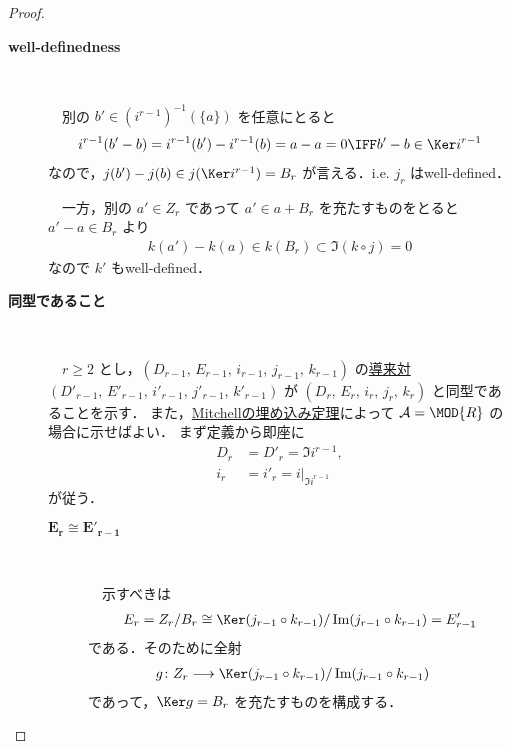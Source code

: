 \documentclass[algtopo_main]{subfiles}
\begin{document}
\begin{proof}
    \begin{description}
        \item[\textbf{well-definedness}]　 
        
        　別の $b' \in (i^{r-1})^{-1}(\{a\})$ を任意にとると
        \begin{align}
            i^{r-1}(b' - b) = i^{r-1}(b') - i^{r-1}(b) = a-a = 0 \IFF b' - b \in \Ker i^{r-1}
        \end{align}
        なので，$j(b') - j(b) \in j(\Ker i^{r-1}) = B_r$ が言える．i.e. $j_r$ はwell-defined．

        　一方，別の $a' \in Z_r$ であって $a' \in a + B_r$ を充たすものをとると $a' - a \in B_r$ より
        \begin{align}
            k(a') - k(a) \in k(B_r) \subset \Im (k\circ j) = 0
        \end{align}
        なので $k'$ もwell-defined．
        \item[\textbf{同型であること}]　
        
        　$r \ge 2$ とし，$(D_{r-1},\, E_{r-1},\, i_{r-1},\, j_{r-1},\, k_{r-1})$ の\hyperref[prop:derived-couple]{導来対} $(D'_{r-1},\, E'_{r-1},\, i'_{r-1},\, j'_{r-1},\, k'_{r-1})$ が $(D_r,\, E_r,\, i_r,\, j_r,\, k_r)$ と同型であることを示す．
        また，\hyperref[thm:embedding]{Mitchellの埋め込み定理}によって $\mathcal{A} = \MOD{R}$ の場合に示せばよい．
        まず定義から即座に
        \begin{align}
            D_r &= D'_r =\Im i^{r-1}, \\
            i_r &= i'_r = i|_{\Im i^{r-1}}
        \end{align}
        が従う．
        
        \begin{description}
            \item[\textbf{$\bm{E_r \cong E'_{r-1}}$}] 　
            
            　示すべきは
            \begin{align}
                \label{eq:DC-rth-isom}
                E_r = Z_r/B_r \cong \Ker (j_{r-1} \circ k_{r-1}) / \Im (j_{r-1} \circ k_{r-1}) = E'_{r-1}
            \end{align}
            である．そのために全射
            \begin{align}
                g\colon Z_r &\lto \Ker (j_{r-1} \circ k_{r-1}) / \Im (j_{r-1} \circ k_{r-1})
            \end{align}
            であって，$\Ker g = B_r$ を充たすものを構成する．


\end{description}
\end{description}
\end{proof}
\end{document}
